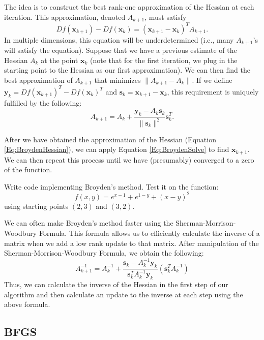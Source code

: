 The idea is to construct the best rank-one approximation of the Hessian at each iteration. This approximation, denoted $A_{k+1}$, must satisfy
\begin{equation} \label{Eq:BroydenRestraint}
Df(\mathbf{x}_{k+1})-Df(\mathbf{x}_k)=(\mathbf{x}_{k+1}-\mathbf{x}_k)^TA_{k+1}.
\end{equation}
In multiple dimensions, this equation will be underdetermined (i.e., many $A_{k+1}$'s will satisfy the equation). Suppose that we have a previous estimate of the Hessian $A_k$ at the point $\mathbf{x}_k$ (note that for the first iteration, we plug in the starting point to the Hessian as our first approximation). We can then find the best approximation of $A_{k+1}$ that minimizes $\|A_{k+1}-A_k\|$. If we define $\mathbf{y}_k = Df(\mathbf{x}_{k+1})^T-Df(\mathbf{x}_k)^T$ and $\mathbf{s}_k=\mathbf{x}_{k+1}-\mathbf{x}_k$, this requirement is uniquely fulfilled by the following:
\begin{equation} \label{Eq:BroydenHessian}
A_{k+1} = A_k + \frac{\mathbf{y}_k-A_k\mathbf{s}_k}{\|\mathbf{s}_k\|^2}\mathbf{s}_k^T.
\end{equation}

After we have obtained the approximation of the Hessian (Equation \ref{Eq:BroydenHessian}), we can apply Equation \ref{Eq:BroydenSolve} to find $\mathbf{x}_{k+1}$. We can then repeat this process until we have (presumably) converged to a zero of the function.

\begin{problem}
Write code implementing Broyden's method. Test it on the function:
\[
f(x,y) = e^{x-1}+e^{1-y}+(x-y)^2
\]
using starting points $(2,3)$ and $(3,2)$.
\end{problem}

\begin{info}
We can often make Broyden's method faster using the Sherman-Morrison-Woodbury Formula.
This formula allows us to efficiently calculate the inverse of a matrix when we add
a low rank update to that matrix. After manipulation of the Sherman-Morrison-Woodbury
Formula, we obtain the following:
\[
A_{k+1}^{-1} = A_{k}^{-1} + \frac{\mathbf{s}_k - A_{k}^{-1}\mathbf{y}_k}{\mathbf{s}_k^T A_{k}^{-1}\mathbf{y}_k} (\mathbf{s}_k^T A_{k}^{-1})
\]
Thus, we can calculate the inverse of the Hessian in the first step of our algorithm
and then calculate an update to the inverse at each step using the above formula.
\end{info}

\subsection*{BFGS}


